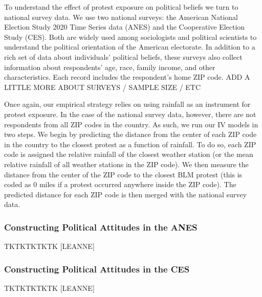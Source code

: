 \documentclass[
  12pt,
]{article}
\begin{document}
To understand the effect of protest exposure on political beliefs we turn to national survey data. We use two national surveys: the American National Election Study 2020 Time Series data (ANES) and the Cooperative Election Study (CES). Both are widely used among sociologists and political scientists to understand the political orientation of the American electorate. In addition to a rich set of data about individuals' political beliefs, these surveys also collect information about respondents' age, race, family income, and other characteristics. Each record includes the respondent's home ZIP code. ADD A LITTLE MORE ABOUT SURVEYS / SAMPLE SIZE / ETC

Once again, our empirical strategy relies on using rainfall as an instrument for protest exposure. In the case of the national survey data, however, there are not respondents from all ZIP codes in the country. As such, we run our IV models in two steps. We begin by predicting the distance from the center of each ZIP code in the country to the closest protest as a function of rainfall. To do so, each ZIP code is assigned the relative rainfall of the closest weather station (or the mean relative rainfall of all weather stations in the ZIP code). We then measure the distance from the center of the ZIP code to the closest BLM protest (this is coded as 0 miles if a protest occurred anywhere inside the ZIP code). The predicted distance for each ZIP code is then merged with the national survey data.

\hypertarget{constructing-political-attitudes-in-the-anes}{%
\subsubsection*{Constructing Political Attitudes in the ANES}\label{constructing-political-attitudes-in-the-anes}}

TKTKTKTKTK {[}LEANNE{]}

\hypertarget{constructing-political-attitudes-in-the-ces}{%
\subsubsection*{Constructing Political Attitudes in the CES}\label{constructing-political-attitudes-in-the-ces}}

TKTKTKTKTK {[}LEANNE{]}

\newpage
\end{document}

